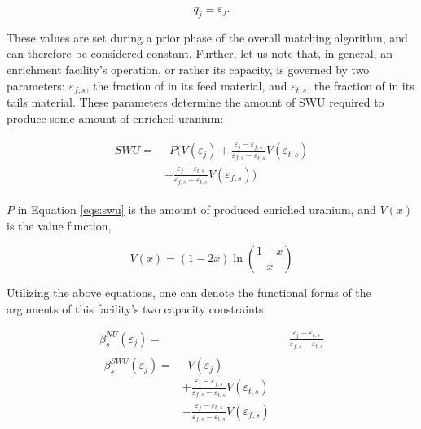 \begin{equation}\label{eqs:enr-q-swu}
  q_{j} \equiv \varepsilon_{j}.
\end{equation}

These values are set during a prior phase of the overall matching algorithm, and
can therefore be considered constant. Further, let us note that, in general, an
enrichment facility's operation, or rather its capacity, is governed by two
parameters: $\varepsilon_{f,s}$, the fraction of  in its feed
material, and $\varepsilon_{t,s}$, the fraction of  in its tails
material. These parameters determine the amount of SWU required to produce some
amount of enriched uranium:

\begin{align}
\begin{split}
\label{eqs:swu}
SWU = & \:\: P ( V(\varepsilon_{j}) 
      + \frac{\varepsilon_{j} - \varepsilon_{f,s}}
               {\varepsilon_{f,s} - \varepsilon_{t,s}} V(\varepsilon_{t,s}) \\
      & - \frac{\varepsilon_{j} - \varepsilon_{t,s}}
               {\varepsilon_{f,s} - \varepsilon_{t,s}} V(\varepsilon_{f,s}) )
\end{split}
\end{align}

$P$ in Equation \ref{eqs:swu} is the amount of produced enriched uranium, and
$V(x)$ is the value function,

\begin{equation}\label{eqs:value}
  V(x) = (1-2x) \ln \left(\frac{1-x}{x}\right)
\end{equation}

Utilizing the above equations, one can denote the functional forms of the
arguments of this facility's two capacity constraints.

\begin{align}
\label{eqs:enr-prod-beta}
\beta_{s}^{NU}(\varepsilon_{j}) = & \:\: \frac{\varepsilon_{j} - \varepsilon_{t,s}}
                                      {\varepsilon_{f,s} - \varepsilon_{t,s}} \\
\begin{split}
\label{eqs:enr-swu-beta}
\beta_{s}^{SWU}(\varepsilon_{j}) = & \:\: V(\varepsilon_{j}) \\
                         & + \frac{\varepsilon_{j} - \varepsilon_{f,s}}
                                  {\varepsilon_{f,s} - \varepsilon_{t,s}} V(\varepsilon_{t,s}) \\
                         & - \frac{\varepsilon_{j} - \varepsilon_{t,s}}
                                  {\varepsilon_{f,s} - \varepsilon_{t,s}} V(\varepsilon_{f,s})
\end{split}
\end{align}

